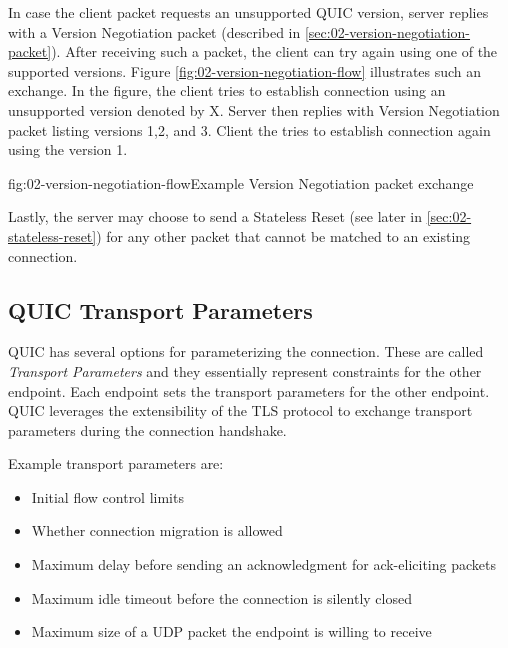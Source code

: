 In case the client packet requests an unsupported QUIC version, server replies with a Version
Negotiation packet (described in \autoref{sec:02-version-negotiation-packet}). After receiving such
a packet, the client can try again using one of the supported versions. Figure
\autoref{fig:02-version-negotiation-flow} illustrates such an exchange. In the figure, the client
tries to establish connection using an unsupported version denoted by X. Server then replies with
Version Negotiation packet listing versions 1,2, and 3. Client the tries to establish connection
again using the version 1.

\begin{myFigure}{fig:02-version-negotiation-flow}{Example Version Negotiation packet exchange}

\resizebox{\linewidth}{!}{}

\end{myFigure}

Lastly, the server may choose to send a Stateless Reset (see later in
\autoref{sec:02-stateless-reset}) for any other packet that cannot be matched to an existing
connection.

\subsection{QUIC Transport Parameters}\label{sec:02-transport-parameters}

QUIC has several options for parameterizing the connection. These are called \textit{Transport
  Parameters} and they essentially represent constraints for the other endpoint. Each endpoint sets
the transport parameters for the other endpoint. QUIC leverages the extensibility of the TLS
protocol to exchange transport parameters during the connection handshake.

Example transport parameters are:

\begin{itemize}

  \item Initial flow control limits

  \item Whether connection migration is allowed

  \item Maximum delay before sending an acknowledgment for ack-eliciting packets

  \item Maximum idle timeout before the connection is silently closed

  \item Maximum size of a UDP packet the endpoint is willing to receive

\end{itemize}

